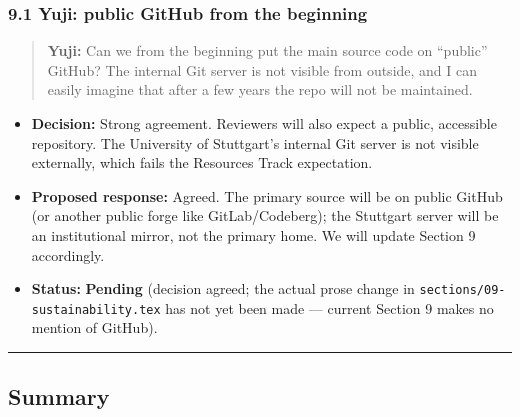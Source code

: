 \subsubsection{9.1 Yuji: public GitHub from the beginning}\label{yuji-public-github-from-the-beginning}

\begin{quote}
\textbf{Yuji:} Can we from the beginning put the main source code on ``public'' GitHub? The internal Git server is not visible from outside, and I can easily imagine that after a few years the repo will not be maintained.
\end{quote}

\begin{itemize}
\tightlist
\item
  \textbf{Decision:} Strong agreement. Reviewers will also expect a public, accessible repository. The University of Stuttgart's internal Git server is not visible externally, which fails the Resources Track expectation.
\item
  \textbf{Proposed response:} Agreed. The primary source will be on public GitHub (or another public forge like GitLab/Codeberg); the Stuttgart server will be an institutional mirror, not the primary home. We will update Section 9 accordingly.
\item
  \textbf{Status:} {\color{orange!80!black}\faPauseCircle} \textbf{Pending} (decision agreed; the actual prose change in \texttt{sections/09-sustainability.tex} has not yet been made --- current Section 9 makes no mention of GitHub).
\end{itemize}

\begin{center}\rule{0.5\linewidth}{0.5pt}\end{center}

\subsection{Summary}\label{summary}

